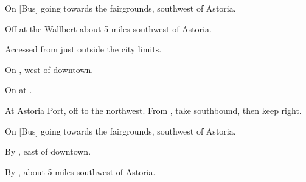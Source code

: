 

\begin{LocationList}

On [Bus] going towards the fairgrounds, southwest of Astoria.

Off  at the Wallbert about 5 miles southwest of Astoria.

Accessed from  just outside the city limits.

\Location{\GasStation \Gas}
On , west of downtown.

\Location{\RestArea \Rest}
On  at .

At Astoria Port, off  to the northwest. From , take  southbound, then keep right.

On [Bus] going towards the fairgrounds, southwest of Astoria.

By , east of downtown.

By , about 5 miles southwest of Astoria.

\end{LocationList}
